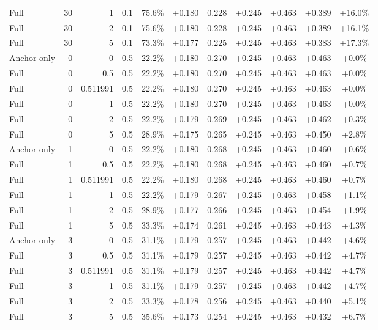 \begin{table}[htbp]
\begin{tabular}{lrrrccccccc}
Full & 30 & 1 & 0.1 & 75.6\% & +0.180 & 0.228 & +0.245 & +0.463 & +0.389 & +16.0\% \\
Full & 30 & 2 & 0.1 & 75.6\% & +0.180 & 0.228 & +0.245 & +0.463 & +0.389 & +16.1\% \\
Full & 30 & 5 & 0.1 & 73.3\% & +0.177 & 0.225 & +0.245 & +0.463 & +0.383 & +17.3\% \\
Anchor only & 0 & 0 & 0.5 & 22.2\% & +0.180 & 0.270 & +0.245 & +0.463 & +0.463 & +0.0\% \\
Full & 0 & 0.5 & 0.5 & 22.2\% & +0.180 & 0.270 & +0.245 & +0.463 & +0.463 & +0.0\% \\
Full & 0 & 0.511991 & 0.5 & 22.2\% & +0.180 & 0.270 & +0.245 & +0.463 & +0.463 & +0.0\% \\
Full & 0 & 1 & 0.5 & 22.2\% & +0.180 & 0.270 & +0.245 & +0.463 & +0.463 & +0.0\% \\
Full & 0 & 2 & 0.5 & 22.2\% & +0.179 & 0.269 & +0.245 & +0.463 & +0.462 & +0.3\% \\
Full & 0 & 5 & 0.5 & 28.9\% & +0.175 & 0.265 & +0.245 & +0.463 & +0.450 & +2.8\% \\
Anchor only & 1 & 0 & 0.5 & 22.2\% & +0.180 & 0.268 & +0.245 & +0.463 & +0.460 & +0.6\% \\
Full & 1 & 0.5 & 0.5 & 22.2\% & +0.180 & 0.268 & +0.245 & +0.463 & +0.460 & +0.7\% \\
Full & 1 & 0.511991 & 0.5 & 22.2\% & +0.180 & 0.268 & +0.245 & +0.463 & +0.460 & +0.7\% \\
Full & 1 & 1 & 0.5 & 22.2\% & +0.179 & 0.267 & +0.245 & +0.463 & +0.458 & +1.1\% \\
Full & 1 & 2 & 0.5 & 28.9\% & +0.177 & 0.266 & +0.245 & +0.463 & +0.454 & +1.9\% \\
Full & 1 & 5 & 0.5 & 33.3\% & +0.174 & 0.261 & +0.245 & +0.463 & +0.443 & +4.3\% \\
Anchor only & 3 & 0 & 0.5 & 31.1\% & +0.179 & 0.257 & +0.245 & +0.463 & +0.442 & +4.6\% \\
Full & 3 & 0.5 & 0.5 & 31.1\% & +0.179 & 0.257 & +0.245 & +0.463 & +0.442 & +4.7\% \\
Full & 3 & 0.511991 & 0.5 & 31.1\% & +0.179 & 0.257 & +0.245 & +0.463 & +0.442 & +4.7\% \\
Full & 3 & 1 & 0.5 & 31.1\% & +0.179 & 0.257 & +0.245 & +0.463 & +0.442 & +4.7\% \\
Full & 3 & 2 & 0.5 & 33.3\% & +0.178 & 0.256 & +0.245 & +0.463 & +0.440 & +5.1\% \\
Full & 3 & 5 & 0.5 & 35.6\% & +0.173 & 0.254 & +0.245 & +0.463 & +0.432 & +6.7\% \\

\end{tabular}
\end{table}
